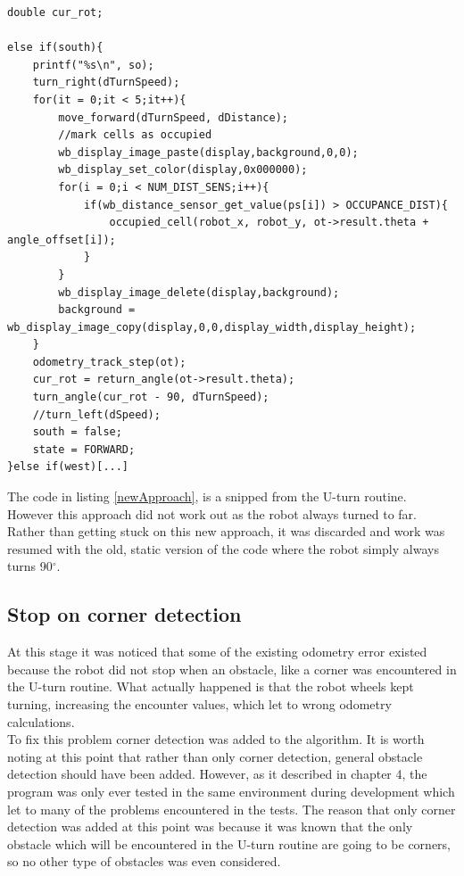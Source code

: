 \begin{lstlisting}[caption={Code snipped of the new approach}, label={newApproach}]
double cur_rot;
    
else if(south){
    printf("%s\n", so);
    turn_right(dTurnSpeed);
    for(it = 0;it < 5;it++){
        move_forward(dTurnSpeed, dDistance);
        //mark cells as occupied
        wb_display_image_paste(display,background,0,0);
        wb_display_set_color(display,0x000000);
        for(i = 0;i < NUM_DIST_SENS;i++){
            if(wb_distance_sensor_get_value(ps[i]) > OCCUPANCE_DIST){
                occupied_cell(robot_x, robot_y, ot->result.theta + angle_offset[i]);
            }
        }
        wb_display_image_delete(display,background);
        background = wb_display_image_copy(display,0,0,display_width,display_height);
    }
    odometry_track_step(ot);
    cur_rot = return_angle(ot->result.theta);
    turn_angle(cur_rot - 90, dTurnSpeed);
    //turn_left(dSpeed);
    south = false;
    state = FORWARD;
}else if(west)[...]
\end{lstlisting}

The code in listing \ref{newApproach}, is a snipped from the U-turn routine. \\
However this approach did not work out as the robot always turned to far. Rather than getting stuck on this new approach, it was discarded and work was resumed with the old, static version of the code where the robot simply always turns 90$^{\circ}$. \\

\subsection{Stop on corner detection}
At this stage it was noticed that some of the existing odometry error existed because the robot did not stop when an obstacle, like a corner was encountered in the U-turn routine.
What actually happened is that the robot wheels kept turning, increasing the encounter values, which let to wrong odometry calculations. \\
To fix this problem corner detection was added to the algorithm.
It is worth noting at this point that rather than only corner detection, general obstacle detection should have been added. However, as it described in chapter 4, the program was only ever tested in the same environment during development which let to many of the problems encountered in the tests.
The reason that only corner detection was added at this point was because it was known that the only obstacle which will be encountered in the U-turn routine are going to be corners, so no other type of obstacles was even considered.\\[3ex]

